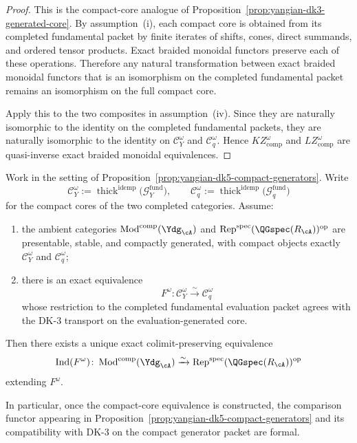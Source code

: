 \begin{proof}
This is the compact-core analogue of
Proposition~\ref{prop:yangian-dk3-generated-core}. By
assumption~\textup{(i)}, each compact core is obtained from its
completed fundamental packet by finite iterates of shifts, cones,
direct summands, and ordered tensor products. Exact braided monoidal
functors preserve each of these operations. Therefore any natural
transformation between exact braided monoidal functors that is an
isomorphism on the completed fundamental packet remains an isomorphism
on the full compact core.

Apply this to the two composites in assumption~\textup{(iv)}. Since
they are naturally isomorphic to the identity on the completed
fundamental packets, they are naturally isomorphic to the identity on
$\mathcal{C}_Y^\omega$ and $\mathcal{C}_q^\omega$. Hence
$KZ^\omega_{\mathrm{comp}}$ and $LZ^\omega_{\mathrm{comp}}$ are
quasi-inverse exact braided monoidal equivalences.
\end{proof}

\begin{proposition}
\label{prop:yangian-dk5-ind-extension}
Work in the setting of
Proposition~\ref{prop:yangian-dk5-compact-generators}. Write
\[
\mathcal{C}_Y^\omega
:=
\operatorname{thick}^{\mathrm{idemp}}
\bigl(\mathcal{G}^{\mathrm{fund}}_{Y}\bigr),
\qquad
\mathcal{C}_q^\omega
:=
\operatorname{thick}^{\mathrm{idemp}}
\bigl(\mathcal{G}^{\mathrm{fund}}_{q}\bigr)
\]
for the compact cores of the two completed categories. Assume:
\begin{enumerate}[label=\textup{(\roman*)}]
\item the ambient categories
 $\operatorname{Mod}^{\mathrm{comp}}(\Ydg_{\cA})$ and
 $\operatorname{Rep}^{\mathrm{spec}}(\QGspec(R_{\cA}))^{\mathrm{op}}$
 are presentable, stable, and compactly generated, with compact
 objects exactly $\mathcal{C}_Y^\omega$ and $\mathcal{C}_q^\omega$;
\item there is an exact equivalence
 \[
 F^\omega\colon \mathcal{C}_Y^\omega \xrightarrow{\sim} \mathcal{C}_q^\omega
 \]
 whose restriction to the completed fundamental evaluation packet
 agrees with the DK-3 transport on the evaluation-generated core.
\end{enumerate}
Then there exists a unique exact colimit-preserving equivalence
\[
\operatorname{Ind}(F^\omega)\colon
\operatorname{Mod}^{\mathrm{comp}}(\Ydg_{\cA})
\xrightarrow{\sim}
\operatorname{Rep}^{\mathrm{spec}}(\QGspec(R_{\cA}))^{\mathrm{op}}
\]
extending $F^\omega$.

In particular, once the compact-core equivalence is constructed, the
comparison functor appearing in
Proposition~\ref{prop:yangian-dk5-compact-generators} and its
compatibility with DK-3 on the compact generator packet are formal.
\end{proposition}

